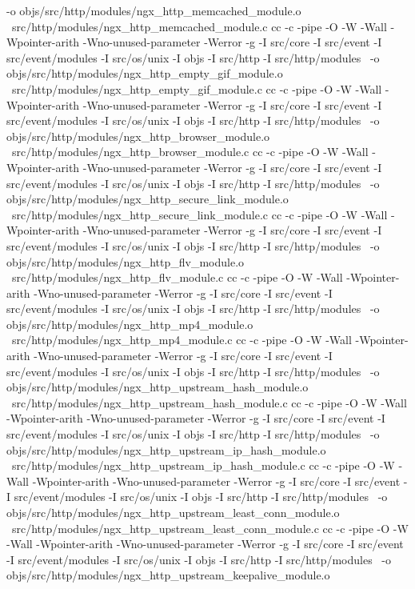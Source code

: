 	-o objs/src/http/modules/ngx_http_memcached_module.o \
	src/http/modules/ngx_http_memcached_module.c
cc -c -pipe  -O -W -Wall -Wpointer-arith -Wno-unused-parameter -Werror -g  -I src/core -I src/event -I src/event/modules -I src/os/unix -I objs -I src/http -I src/http/modules \
	-o objs/src/http/modules/ngx_http_empty_gif_module.o \
	src/http/modules/ngx_http_empty_gif_module.c
cc -c -pipe  -O -W -Wall -Wpointer-arith -Wno-unused-parameter -Werror -g  -I src/core -I src/event -I src/event/modules -I src/os/unix -I objs -I src/http -I src/http/modules \
	-o objs/src/http/modules/ngx_http_browser_module.o \
	src/http/modules/ngx_http_browser_module.c
cc -c -pipe  -O -W -Wall -Wpointer-arith -Wno-unused-parameter -Werror -g  -I src/core -I src/event -I src/event/modules -I src/os/unix -I objs -I src/http -I src/http/modules \
	-o objs/src/http/modules/ngx_http_secure_link_module.o \
	src/http/modules/ngx_http_secure_link_module.c
cc -c -pipe  -O -W -Wall -Wpointer-arith -Wno-unused-parameter -Werror -g  -I src/core -I src/event -I src/event/modules -I src/os/unix -I objs -I src/http -I src/http/modules \
	-o objs/src/http/modules/ngx_http_flv_module.o \
	src/http/modules/ngx_http_flv_module.c
cc -c -pipe  -O -W -Wall -Wpointer-arith -Wno-unused-parameter -Werror -g  -I src/core -I src/event -I src/event/modules -I src/os/unix -I objs -I src/http -I src/http/modules \
	-o objs/src/http/modules/ngx_http_mp4_module.o \
	src/http/modules/ngx_http_mp4_module.c
cc -c -pipe  -O -W -Wall -Wpointer-arith -Wno-unused-parameter -Werror -g  -I src/core -I src/event -I src/event/modules -I src/os/unix -I objs -I src/http -I src/http/modules \
	-o objs/src/http/modules/ngx_http_upstream_hash_module.o \
	src/http/modules/ngx_http_upstream_hash_module.c
cc -c -pipe  -O -W -Wall -Wpointer-arith -Wno-unused-parameter -Werror -g  -I src/core -I src/event -I src/event/modules -I src/os/unix -I objs -I src/http -I src/http/modules \
	-o objs/src/http/modules/ngx_http_upstream_ip_hash_module.o \
	src/http/modules/ngx_http_upstream_ip_hash_module.c
cc -c -pipe  -O -W -Wall -Wpointer-arith -Wno-unused-parameter -Werror -g  -I src/core -I src/event -I src/event/modules -I src/os/unix -I objs -I src/http -I src/http/modules \
	-o objs/src/http/modules/ngx_http_upstream_least_conn_module.o \
	src/http/modules/ngx_http_upstream_least_conn_module.c
cc -c -pipe  -O -W -Wall -Wpointer-arith -Wno-unused-parameter -Werror -g  -I src/core -I src/event -I src/event/modules -I src/os/unix -I objs -I src/http -I src/http/modules \
	-o objs/src/http/modules/ngx_http_upstream_keepalive_module.o \
